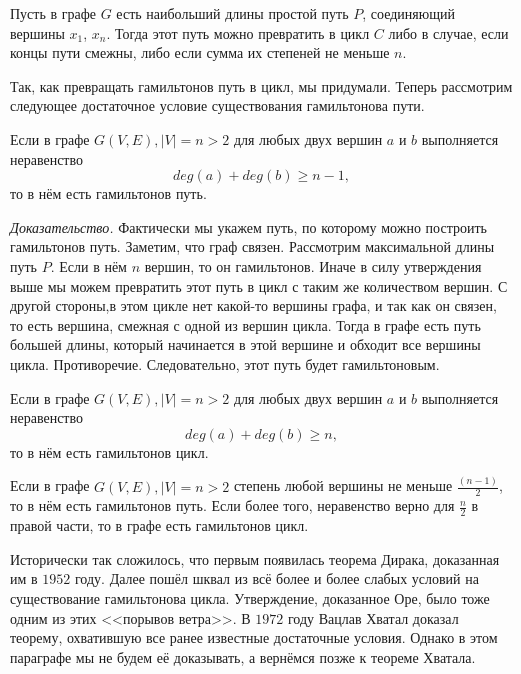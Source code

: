 \begin{consequence}
	Пусть в графе $G$ есть наибольший длины простой путь $P$, соединяющий вершины $x_1$, $x_n$. Тогда этот путь можно превратить в цикл $C$ либо в случае, если концы пути смежны, либо если сумма их степеней не меньше $n$.
\end{consequence}

	Так, как превращать гамильтонов путь в цикл, мы придумали. Теперь рассмотрим следующее достаточное условие существования гамильтонова пути.
	
\begin{theorem}[Оре]
	Если в графе $G(V, E), |V| = n > 2$ для любых двух вершин $a$ и $b$ выполняется неравенство 
	$$deg (a) + deg (b) \geqslant n-1,$$
	то в нём есть гамильтонов путь.
	
	\emph{Доказательство.} Фактически мы укажем путь, по которому можно построить гамильтонов путь. Заметим, что граф связен. Рассмотрим максимальной длины путь $P$. Если в нём $n$ вершин, то он гамильтонов. Иначе в силу утверждения выше мы можем превратить этот путь в цикл с таким же количеством вершин. С другой стороны,в этом цикле нет какой-то вершины графа, и так как он связен, то есть вершина, смежная с одной из вершин цикла. Тогда в графе есть путь большей длины, который начинается в этой вершине и обходит все вершины цикла. Противоречие. Следовательно, этот путь будет гамильтоновым.
\end{theorem}

\begin{consequence}
	Если в графе $G(V, E), |V| = n > 2$ для любых двух вершин $a$ и $b$ выполняется неравенство 
	$$deg (a) + deg (b) \geqslant n,$$
	то в нём есть гамильтонов цикл.
\end{consequence}

\begin{consequence}[Дирак]
	Если в графе $G(V, E), |V| = n > 2$ степень любой вершины не меньше $\frac{(n-1)}{2}$, то в нём есть гамильтонов путь. Если более того, неравенство верно для $\frac{n}{2}$ в правой части, то в графе есть гамильтонов цикл.
\end{consequence}

	Исторически так сложилось, что первым появилась теорема Дирака, доказанная им в $1952$ году. Далее пошёл шквал из всё более и более слабых условий на существование гамильтонова цикла. Утверждение, доказанное Оре, было тоже одним из этих <<порывов ветра>>. В $1972$ году Вацлав Хватал доказал теорему, охватившую все ранее известные достаточные условия. Однако в этом параграфе мы не будем её доказывать, а вернёмся позже к теореме Хватала.

